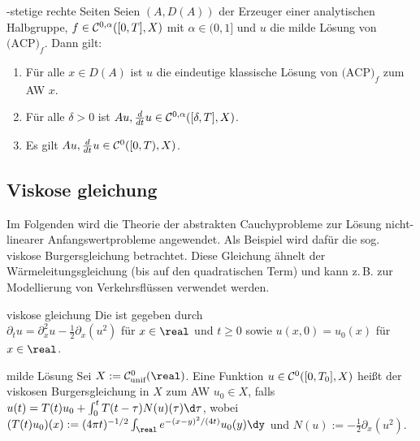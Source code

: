 \begin{Satz}{-stetige rechte Seiten}
    Seien $(A, D(A))$ der Erzeuger einer analytischen Halbgruppe,
    $f \in \mathcal{C}^{0,\alpha}([0, T], X)$ mit $\alpha \in (0, 1]$
    und $u$ die milde Lösung von $\text{(ACP)}_f$.
    Dann gilt:
    \begin{enumerate}
        \item
        Für alle $x \in D(A)$ ist $u$ die eindeutige klassische Lösung von $\text{(ACP)}_f$
        zum AW $x$.
        
        \item
        Für alle $\delta > 0$ ist $Au, \frac{d}{dt} u \in \mathcal{C}^{0,\alpha}([\delta, T], X)$.
        
        \item
        Es gilt $Au, \frac{d}{dt} u \in \mathcal{C}^0([0, T), X)$.
    \end{enumerate}
\end{Satz}

\pagebreak

\subsection{%
    Viskose gleichung%
}

\begin{Bem}
    Im Folgenden wird die Theorie der abstrakten Cauchyprobleme zur Lösung nicht-linearer
    Anfangswertprobleme angewendet.
    Als Beispiel wird dafür die sog. viskose Burgersgleichung betrachtet.
    Diese Gleichung ähnelt der Wärmeleitungsgleichung (bis auf den quadratischen Term) und
    kann z.\,B. zur Modellierung von Verkehrsflüssen verwendet werden.
\end{Bem}

\begin{Def}{viskose gleichung}
    Die  ist gegeben durch\\
    $\partial_t u = \partial_x^2 u - \frac{1}{2} \partial_x (u^2)$ für $x \in \real$ und $t \ge 0$
    sowie $u(x, 0) = u_0(x)$ für $x \in \real$.
\end{Def}

\begin{Def}{milde Lösung}
    Sei $X := \C^0_\unif(\real)$.
    Eine Funktion $u \in \mathcal{C}^0([0, T_0], X)$ heißt
     der viskosen Burgersgleichung in $X$ zum AW $u_0 \in X$,
    falls
    $u(t) = T(t)u_0 + \int_0^t T(t - \tau) N(u)(\tau) \d\tau$,
    wobei $(T(t)u_0)(x) := (4\pi t)^{-1/2} \int_\real e^{-(x-y)^2/(4t)} u_0(y)\dy$ und
    $N(u) := -\frac{1}{2} \partial_x (u^2)$.
\end{Def}

